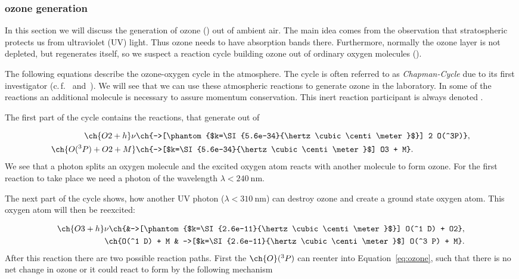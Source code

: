 \subsubsection{ozone generation}
\label{sec:theory-ozone}

In this section we will discuss the generation of ozone () out of ambient
air. The main idea comes from the observation that stratospheric
 protects us from ultraviolet (UV) light. Thus ozone needs to
have absorption bands there. Furthermore, normally the ozone layer is
not depleted, but regenerates itself, so we suspect a reaction
cycle building ozone out of ordinary oxygen molecules ().

The following equations describe the ozone-oxygen cycle in the
atmosphere.  The cycle is often referred to as \emph{Chapman-Cycle}
due to its first investigator (c.\,f.~\cite{chapman}
and~\cite{roedel}). We will see that we can use these atmospheric
reactions to generate ozone in the laboratory. In some of the
reactions an additional molecule is necessary to assure momentum
conservation. This inert reaction participant is always denoted
.

The first part of the cycle contains the reactions, that generate
 out of 

\begin{align}
  \ch{O2 + h}\nu &\ch{->[\phantom{$k=\SI{5.6e-34}{\hertz\cubic\centi\meter}$}] 2 O(^3P)},\nonumber\\
  \ch{O(^3 P) + O2 + M} &\ch{->[$k=\SI{5.6e-34}{\hertz\cubic\centi\meter}$] O3 + M}. \label{eq:ozone}
\end{align}
We see that a photon splits an oxygen molecule and the excited
oxygen atom reacts with another  molecule to form ozone. For
the first reaction to take place we need a photon of the wavelength
$\lambda < \SI{240}{\nano\meter}$.

The next part of the cycle shows, how another UV photon ($\lambda <
\SI{310}{\nano\meter}$) can destroy
ozone and create a ground state oxygen atom. This oxygen atom will
then be reexcited:

\begin{align}
  \ch{O3 + h}\nu \ch{&->[\phantom{$k=\SI{2.6e-11}{\hertz\cubic\centi\meter}$}] O(^1 D) +
  O2}, \label{eq:split}\\
  \ch{O(^1 D) + M & ->[$k=\SI{2.6e-11}{\hertz\cubic\centi\meter}$] O(^3 P) + M}.\nonumber
\end{align}
After this reaction there are two possible reaction paths. First the $\ch{O}(^3
P)$ can reenter into Equation~\eqref{eq:ozone}, such that there is no
net change in ozone or it could react to form  by the
following mechanism

